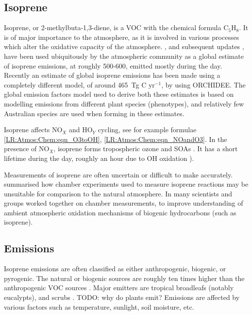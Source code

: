   \subsection{Isoprene}
  \label{LR:VOCs:Isop}
    Isoprene, or 2-methylbuta-1,3-diene, is a VOC with the chemical formula C$_5$H$_8$. 
    It is of major importance to the atmosphere, as it is involved in various processes which alter the oxidative capacity of the atmosphere.
    \cite{Guenther1995}, and subsequent updates \citep{Guenther2000,Guenther2006,Guenther2012}, have been used ubiquitously by the atmospheric community as a global estimate of isoprene emissions, at roughly 500-600\tgpyr, emitted mostly during the day.
    Recently an estimate of global isoprene emissions has been made using a completely different model, of around 465~Tg C yr$^{-1}$, by \cite{Messina2016} using ORCHIDEE.
    The global emission factors model used to derive both these estimates is based on modelling emissions from different plant species (phenotypes), and relatively few Australian species are used when forming in these estimates.
    
    Isoprene affects NO$_X$ and HO$_Y$ cycling, see for example formulae \ref{LR:Atmos:Chem:eqn_O3toOH}, \ref{LR:Atmos:Chem:eqn_NOandO3}.
    In the presence of NO$_X$, isoprene forms tropospheric ozone and SOAs \citep{Wagner2002, Millet2006}.
    It has a short lifetime during the day, roughly an hour due to OH oxidation \citep{AtkinsonArey2003}).
    
    
    Measurements of isoprene are often uncertain or difficult to make accurately.
    \cite{Kanakidou2005} summarised how chamber experiments used to measure isoprene reactions may be unsuitable for comparison to the natural atmosphere.
    In \cite{Nguyen2014} many scientists and groups worked together on chamber measurements, to improve understanding of ambient atmospheric oxidation mechanisms of biogenic hydrocarbons (such as isoprene).
    
    
  \subsection{Emissions}
  \label{LR:VOCs:Emissions}
    
    
    Isoprene emissions are often classified as either anthropogenic, biogenic, or pyrogenic.
    The natural or biogenic sources are roughly ten times higher than the anthropogenic VOC sources \citep{Guenther2006, Kanakidou2005}.
    Major emitters are tropical broadleafs (notably eucalypts), and scrubs \citep{Guenther2006, Arneth2008, Niinemets2010, Monks2015}.
    TODO: why do plants emit?
    Emissions are affected by various factors such as temperature, sunlight, soil moisture, etc.
    
